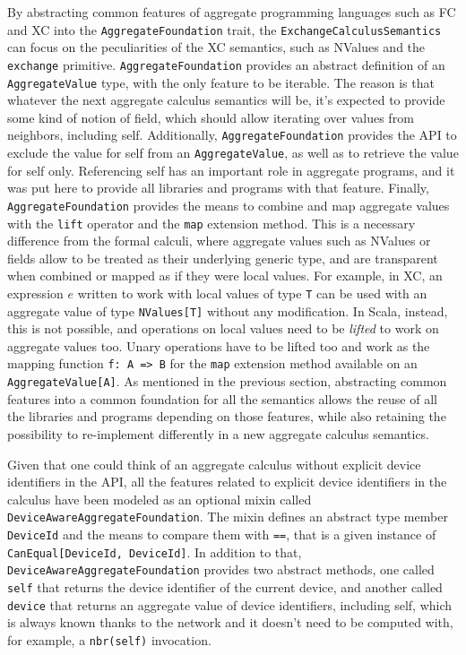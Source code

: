 By abstracting common features of aggregate programming languages such as \ac{FC} and \ac{XC} into the \texttt{AggregateFoundation} trait, the \texttt{ExchangeCalculusSemantics} can focus on the peculiarities of the \ac{XC} semantics, such as NValues and the \texttt{exchange} primitive.
%
\texttt{AggregateFoundation} provides an abstract definition of an \texttt{AggregateValue} type, with the only feature to be iterable.
%
The reason is that whatever the next aggregate calculus semantics will be, it's expected to provide some kind of notion of field, which should allow iterating over values from neighbors, including self.
%
Additionally, \texttt{AggregateFoundation} provides the \ac{API} to exclude the value for self from an \texttt{AggregateValue}, as well as to retrieve the value for self only.
%
Referencing self has an important role in aggregate programs, and it was put here to provide all libraries and programs with that feature.
%
Finally, \texttt{AggregateFoundation} provides the means to combine and map aggregate values with the \texttt{lift} operator and the \texttt{map} extension method.
%
This is a necessary difference from the formal calculi, where aggregate values such as NValues or fields allow to be treated as their underlying generic type, and are transparent when combined or mapped as if they were local values.
%
For example, in \ac{XC}, an expression $e$ written to work with local values of type \texttt{T} can be used with an aggregate value of type \texttt{NValues[T]} without any modification.
%
In Scala, instead, this is not possible, and operations on local values need to be \textit{lifted} to work on aggregate values too.
%
Unary operations have to be lifted too and work as the mapping function \texttt{f: A => B} for the \texttt{map} extension method available on an \texttt{AggregateValue[A]}.
%
As mentioned in the previous section, abstracting common features into a common foundation for all the semantics allows the reuse of all the libraries and programs depending on those features, while also retaining the possibility to re-implement differently in a new aggregate calculus semantics.

Given that one could think of an aggregate calculus without explicit device identifiers in the \ac{API}, all the features related to explicit device identifiers in the calculus have been modeled as an optional mixin called \texttt{DeviceAwareAggregateFoundation}.
%
The mixin defines an abstract type member \texttt{DeviceId} and the means to compare them with \texttt{==}, that is a given instance of \texttt{CanEqual[DeviceId, DeviceId]}.
%
In addition to that, \texttt{DeviceAwareAggregateFoundation} provides two abstract methods, one called \texttt{self} that returns the device identifier of the current device, and another called \texttt{device} that returns an aggregate value of device identifiers, including self, which is always known thanks to the network and it doesn't need to be computed with, for example, a \texttt{nbr(self)} invocation.

